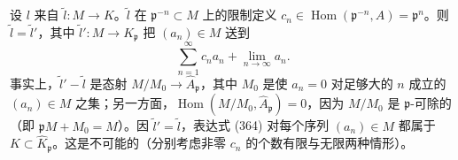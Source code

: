 设 $l$ 来自 $\tilde l:M\to K$。$\tilde l$ 在 $\mathfrak{p}^{-n}\subset M$ 上的限制定义 $c_n\in\operatorname{Hom}(\mathfrak{p}^{-n},A)=\mathfrak{p}^n$。则 $\tilde l=\tilde l'$，其中 $\tilde l':M\to K_{\mathfrak{p}}$ 把 $(a_n)\in M$ 送到
\begin{equation}\tag{364}
\sum_{n=1}^{\infty}c_na_n+\lim_{n\to\infty}a_n.
\end{equation}
事实上，$\tilde l'-\tilde l$ 是态射 $M/M_0\to\widehat A_{\mathfrak{p}}$，其中 $M_0$ 是使 $a_n=0$ 对足够大的 $n$ 成立的 $(a_n)\in M$ 之集；另一方面，$\operatorname{Hom}(M/M_0,\widehat A_{\mathfrak{p}})=0$，因为 $M/M_0$ 是 $\mathfrak{p}$-可除的（即 $\mathfrak{p}M+M_0=M$）。因 $\tilde l'=\tilde l$，表达式 (364) 对每个序列 $(a_n)\in M$ 都属于 $K\subset\widehat K_{\mathfrak{p}}$。这是不可能的（分别考虑非零 $c_n$ 的个数有限与无限两种情形）。

